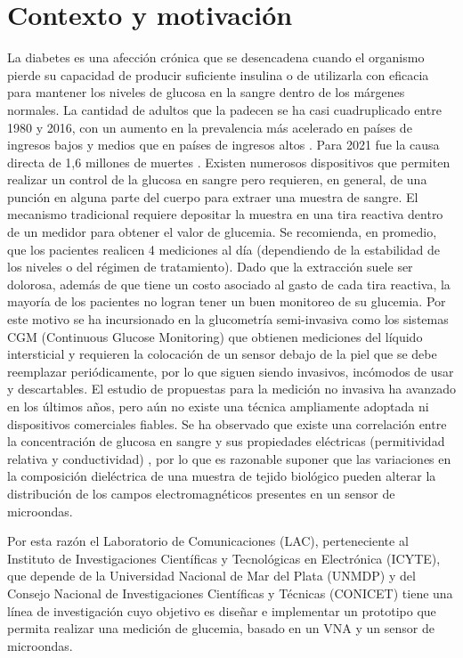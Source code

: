 \section{Contexto y motivación}

La diabetes es una afección crónica que se desencadena cuando el organismo pierde su capacidad de producir suficiente insulina o de utilizarla con eficacia para mantener los niveles de glucosa en la sangre dentro de los márgenes normales. La cantidad de adultos que la padecen se ha casi cuadruplicado entre 1980 y 2016, con un aumento en la prevalencia más acelerado en países de ingresos bajos y medios que en países de ingresos altos \cite{OMS_2016}. Para 2021 fue la causa directa de 1,6 millones de muertes \cite{OMS_2024}.
Existen numerosos dispositivos que permiten realizar un control de la glucosa en sangre pero requieren, en general, de una punción en alguna parte del cuerpo para extraer una muestra de sangre. El mecanismo tradicional requiere depositar la muestra en una tira reactiva dentro de un medidor para obtener el valor de glucemia. Se recomienda, en promedio, que los pacientes realicen 4 mediciones al día (dependiendo de la estabilidad de los niveles o del régimen de tratamiento). Dado que la extracción suele ser dolorosa, además de que tiene un costo asociado al gasto de cada tira reactiva,  la mayoría de los pacientes no logran tener un buen monitoreo de su glucemia. Por este motivo se ha incursionado en la glucometría semi-invasiva como los sistemas CGM (Continuous Glucose Monitoring) \cite{Freestylelibre} que obtienen mediciones del líquido intersticial y requieren la colocación de un sensor debajo de la piel que se debe reemplazar periódicamente, por lo que siguen siendo invasivos, incómodos de usar y descartables. 
El estudio de propuestas para la medición no invasiva ha avanzado en los últimos años, pero aún no existe una técnica ampliamente adoptada ni dispositivos comerciales fiables.
Se ha observado que existe una correlación entre la concentración de glucosa en sangre y sus propiedades eléctricas (permitividad relativa y conductividad) \cite{Topsakal}, por lo que es razonable suponer que las variaciones en la composición dieléctrica de una muestra de tejido biológico pueden alterar la distribución de los campos electromagnéticos presentes en un sensor de microondas. 

Por esta razón el Laboratorio de Comunicaciones (LAC), perteneciente al Instituto de Investigaciones Científicas y Tecnológicas en Electrónica (ICYTE), que depende de la Universidad Nacional de Mar del Plata (UNMDP) y del Consejo Nacional de Investigaciones Científicas y Técnicas (CONICET) tiene una línea de investigación cuyo objetivo es diseñar e implementar un prototipo que permita realizar una medición de glucemia, basado en un VNA y un sensor de microondas.

